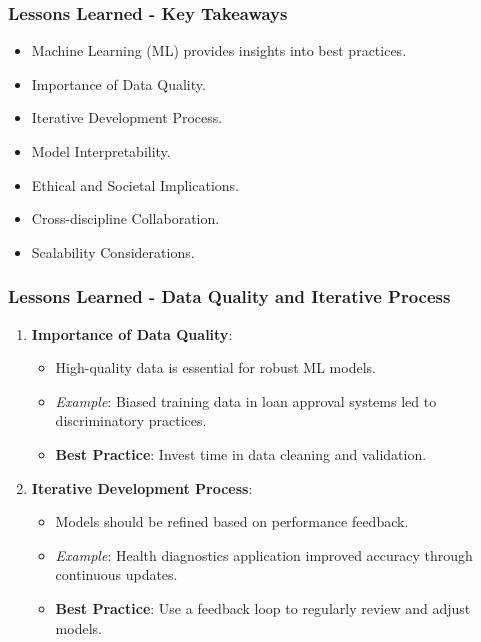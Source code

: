 \documentclass{beamer}
\begin{document}
\begin{frame}[fragile]
    \frametitle{Lessons Learned - Key Takeaways}
    \begin{itemize}
        \item Machine Learning (ML) provides insights into best practices.
        \item Importance of Data Quality.
        \item Iterative Development Process.
        \item Model Interpretability.
        \item Ethical and Societal Implications.
        \item Cross-discipline Collaboration.
        \item Scalability Considerations.
    \end{itemize}
\end{frame}

\begin{frame}[fragile]
    \frametitle{Lessons Learned - Data Quality and Iterative Process}
    \begin{enumerate}
        \item \textbf{Importance of Data Quality}:
        \begin{itemize}
            \item High-quality data is essential for robust ML models.
            \item \textit{Example}: Biased training data in loan approval systems led to discriminatory practices.
            \item \textbf{Best Practice}: Invest time in data cleaning and validation.
        \end{itemize}

        \item \textbf{Iterative Development Process}:
        \begin{itemize}
            \item Models should be refined based on performance feedback.
            \item \textit{Example}: Health diagnostics application improved accuracy through continuous updates.
            \item \textbf{Best Practice}: Use a feedback loop to regularly review and adjust models.
        \end{itemize}
    \end{enumerate}
\end{frame}
\end{document}
